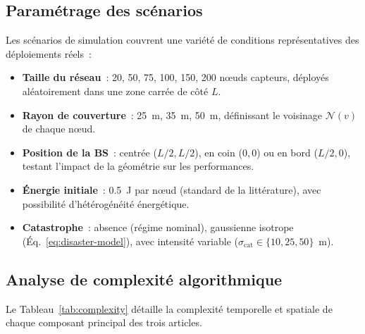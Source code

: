 \subsection{Paramétrage des scénarios}

Les scénarios de simulation couvrent une variété de conditions représentatives des déploiements réels~:
\begin{itemize}
    \item \textbf{Taille du réseau}~: 20, 50, 75, 100, 150, 200 n\oe{}uds capteurs, déployés aléatoirement dans une zone carrée de côté $L$.
    \item \textbf{Rayon de couverture}~: 25~m, 35~m, 50~m, définissant le voisinage $\mathcal{N}(v)$ de chaque n\oe{}ud.
    \item \textbf{Position de la BS}~: centrée ($L/2, L/2$), en coin ($0, 0$) ou en bord ($L/2, 0$), testant l'impact de la géométrie sur les performances.
    \item \textbf{Énergie initiale}~: 0.5~J par n\oe{}ud (standard de la littérature), avec possibilité d'hétérogénéité énergétique.
    \item \textbf{Catastrophe}~: absence (régime nominal), gaussienne isotrope (Éq.~\ref{eq:disaster-model}), avec intensité variable ($\sigma_{\text{cat}} \in \{10, 25, 50\}$~m).
\end{itemize}

\subsection{Analyse de complexité algorithmique}

Le Tableau~\ref{tab:complexity} détaille la complexité temporelle et spatiale de chaque composant principal des trois articles.

